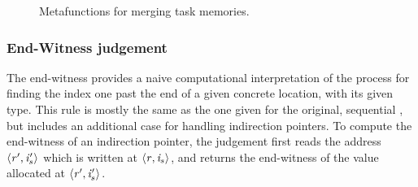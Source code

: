 {
\begin{figure}[h!]
\metafmerging
\caption{Metafunctions for merging task memories.}
\label{fig:appendix-merging-task-memories}
\end{figure}
}

\subsubsection{End-Witness judgement}
\label{subsec:appendix-end-witness-judgement}

The end-witness provides a naive computational interpretation
of the process for finding the index one past the end of a
given concrete location, with its given type.
%
This rule is mostly the same as the one given for the original, sequential \seqcalc{},
but includes an additional case for handling indirection pointers.
%
To compute the end-witness of an indirection pointer,
the judgement first reads the address $\langle \mathit{r}', \mathit{i}'_s \rangle ^{}$ which is written
at $\langle \mathit{r}, \mathit{i}_s \rangle ^{}$,
and returns the end-witness of the value allocated at $\langle \mathit{r}', \mathit{i}'_s \rangle ^{}$.

